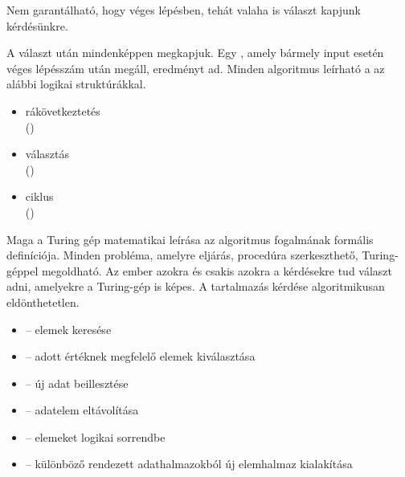 \documentclass[main.tex]{subfiles}
\begin{document}
  Nem garantálható, hogy véges lépésben,
  tehát valaha is választ kapjunk kérdésünkre.


  A választ  után mindenképpen megkapjuk.
  Egy , amely bármely input esetén
  véges lépésszám után megáll, eredményt ad.
  Minden algoritmus leírható a az alábbi logikai struktúrákkal.
  \begin{multicols}{3}
    \begin{itemize}
      \item rákövetkeztetés \\ ()
      \item választás \\ ()
      \item ciklus \\ ()
    \end{itemize}
  \end{multicols}
  Maga a Turing gép matematikai leírása az algoritmus
  fogalmának formális definíciója.
  Minden probléma, amelyre eljárás,
  procedúra szerkeszthető, Turing-géppel megoldható.
  Az ember azokra és csakis azokra a kérdésekre tud választ adni,
  amelyekre a Turing-gép is képes.
  A tartalmazás kérdése algoritmikusan eldönthetetlen.
  \begin{multicols}{2}
    \begin{itemize}
      \item {} – elemek keresése
      
      \item {} – adott értéknek megfelelő elemek kiválasztása
      
      \item {} – új adat beillesztése
      
      \item {} – adatelem eltávolítása
      
      \item {} – elemeket logikai sorrendbe
      
      \item {} – különböző rendezett
      adathalmazokból új elemhalmaz kialakítása
    \end{itemize}
  \end{multicols}


\end{document}
